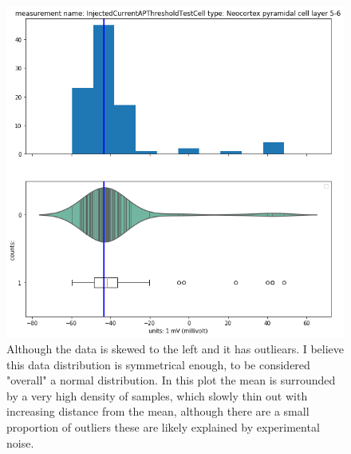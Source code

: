 \begin{figure} 
    \begin{center}
    \includegraphics[scale=0.8]{figures/mean_well_served2.png}
    \end{center}
    \caption[AP Amplitude Data Distribution, Layer 5 Pyramidal Cell]{Although the data is skewed to the left and it has outliears. I believe this data distribution is symmetrical enough, to be considered "overall" a normal distribution. In this plot the mean is surrounded by a very high density of samples, which slowly thin out with increasing distance from the mean, although there are a small proportion of outliers these are likely explained by experimental noise.}
    \label{fig:normal-feature2}
\end{figure}   
 
